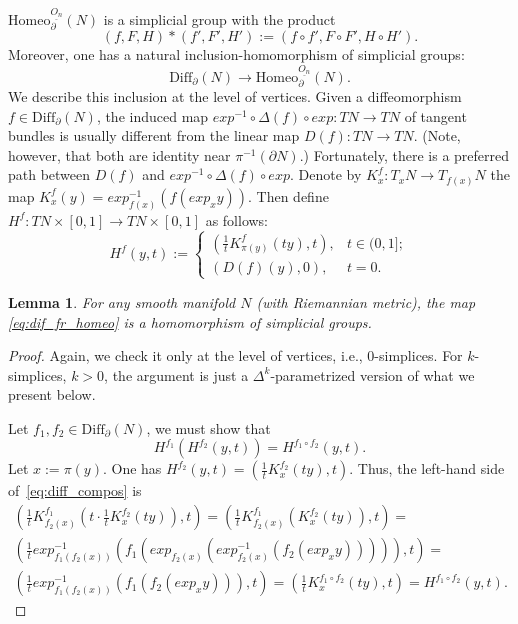 \documentclass[11pt]{amsart}
\newtheorem{lemma}[theorem]{Lemma}
\theoremstyle{definition}
\newcommand{\Diff}{\mathrm{Diff}}
\newcommand{\Homeo}{\mathrm{Homeo}}
\numberwithin{equation}{section}
\begin{document}
$\Homeo_\partial^{\underline{O_n}}(N)$ is a simplicial group with the product
\[
(f,F,H)*(f',F',H'):=(f\circ f',F\circ F',H\circ H').
\]
Moreover, one has a natural inclusion-homomorphism of simplicial groups:
\begin{equation}\label{eq:dif_fr_homeo}
\Diff_\partial(N)\to \Homeo_\partial^{\underline{O_n}}(N).
\end{equation}
We describe this inclusion at the level of vertices. Given a diffeomorphism $f\in\Diff_\partial(N)$, the induced map $exp^{-1}\circ \Delta(f)\circ exp
\colon TN\to TN$ of tangent bundles is usually different from the linear map $D(f)\colon TN\to TN$.
 (Note, however, that both are identity near $\pi^{-1}(\partial N)$.) Fortunately, there is a preferred path between $D(f)$ and $exp^{-1}\circ \Delta(f)\circ exp$.
 Denote by $K_x^f\colon T_xN\to T_{f(x)}N$ the map $K_x^f(y)=exp^{-1}_{f(x)}\left(f(exp_x y)\right)$. Then define $H^f\colon TN\times [0,1]\to
 TN\times[0,1]$ as follows:
 \[
 H^f(y,t):=
 \begin{cases}
 \left(\frac 1t K_{\pi(y)}^f(ty),t\right),& t\in(0,1];\\
 \left(D(f)(y),0\right),& t=0.
 \end{cases}
 \]


\begin{lemma}\label{l:dif_fr_homeo}
For any smooth manifold $N$ (with Riemannian metric), the map \eqref{eq:dif_fr_homeo} is a homomorphism of simplicial groups.
\end{lemma}

\begin{proof}
Again, we check it only at the level of vertices, i.e., 0-simplices. For $k$-simplices, $k>0$, the argument is just a $\Delta^k$-parametrized version of 
what we present below.

Let $f_1,f_2\in \Diff_\partial(N)$, we must show that 
\begin{equation}\label{eq:diff_compos}
H^{f_1}\left(H^{f_2}(y,t) \right)=H^{f_1\circ f_2}(y,t).
\end{equation}
Let $x:=\pi(y)$. One has $H^{f_2}(y,t)=\left(\frac 1t K_x^{f_2}(ty),t\right).$ Thus, the left-hand side of~\eqref{eq:diff_compos} is
\begin{multline*}
\left(\frac 1tK^{f_1}_{f_2(x)}\left(t\cdot\frac 1t K_x^{f_2}(ty)\right),t\right)=
\left(\frac 1tK^{f_1}_{f_2(x)}\left( K_x^{f_2}(ty)\right),t\right)=\\
\left(\frac 1t exp^{-1}_{f_1(f_2(x))}\left(f_1\left(exp_{f_2(x)}\left( exp^{-1}_{f_2(x)}\left(f_2(exp_xy)\right)\right)\right)\right),t\right)=\\
\left(\frac 1t exp^{-1}_{f_1(f_2(x))}\left(f_1\left(f_2(exp_xy)\right)\right),t\right)=
\left(\frac 1t K_x^{f_1\circ f_2}(ty),t\right)=
H^{f_1\circ f_2}(y,t).
\end{multline*}
\end{proof}
\end{document}
